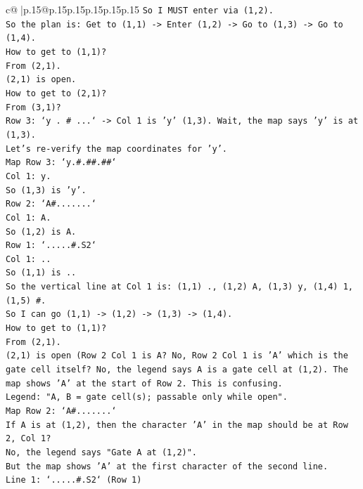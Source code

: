 \documentclass{article}
\begin{document}
{\begin{supertabular}{c@{$\;$}|p{.15\linewidth}@{}p{.15\linewidth}p{.15\linewidth}p{.15\linewidth}p{.15\linewidth}p{.15\linewidth}}
{{{\texttt{So I MUST enter via (1,2).} \\
\texttt{So the plan is: Get to (1,1) {-}> Enter (1,2) {-}> Go to (1,3) {-}> Go to (1,4).} \\
\texttt{How to get to (1,1)?} \\
\texttt{From (2,1).} \\
\texttt{(2,1) is open.} \\
\texttt{How to get to (2,1)?} \\
\texttt{From (3,1)?} \\
\texttt{Row 3: `y . \# ...` {-}> Col 1 is 'y' (1,3). Wait, the map says 'y' is at (1,3).} \\
\texttt{Let's re{-}verify the map coordinates for 'y'.} \\
\texttt{Map Row 3: `y.\#.\#\#.\#\#`} \\
\texttt{Col 1: y.} \\
\texttt{So (1,3) is 'y'.} \\
\texttt{Row 2: `A\#.......`} \\
\texttt{Col 1: A.} \\
\texttt{So (1,2) is A.} \\
\texttt{Row 1: `.....\#.S2`} \\
\texttt{Col 1: ..} \\
\texttt{So (1,1) is ..} \\
\texttt{So the vertical line at Col 1 is: (1,1) ., (1,2) A, (1,3) y, (1,4) 1, (1,5) \#.} \\
\texttt{So I can go (1,1) {-}> (1,2) {-}> (1,3) {-}> (1,4).} \\
\texttt{How to get to (1,1)?} \\
\texttt{From (2,1).} \\
\texttt{(2,1) is open (Row 2 Col 1 is A? No, Row 2 Col 1 is 'A' which is the gate cell itself? No, the legend says A is a gate cell at (1,2). The map shows 'A' at the start of Row 2. This is confusing.} \\
\texttt{Legend: "A, B = gate cell(s); passable only while open".} \\
\texttt{Map Row 2: `A\#.......`} \\
\texttt{If A is at (1,2), then the character 'A' in the map should be at Row 2, Col 1?} \\
\texttt{No, the legend says "Gate A at (1,2)".} \\
\texttt{But the map shows 'A' at the first character of the second line.} \\
\texttt{Line 1: `.....\#.S2` (Row 1)} \\
}}}
\end{supertabular}}
\end{document}
